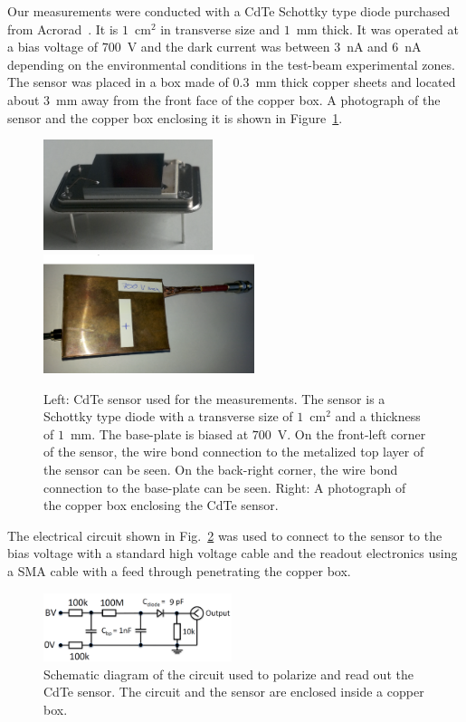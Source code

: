 %
Our measurements were conducted with a CdTe Schottky type diode purchased from 
Acrorad~\cite{acrorad}. It is $1$~$\mathrm{cm}^{2}$ in transverse size and $1$~mm thick.
It was operated at a bias voltage of $700$~V and the dark current was between $3$~nA 
and $6$~nA depending on the environmental conditions in the test-beam experimental 
zones. The sensor was placed in a box made of $0.3$~mm thick copper sheets and located
about $3$~mm away from the front face of the copper box.
A photograph of the sensor and the copper box enclosing it is shown in 
Figure~\ref{fig:CdTeSensor}.

%
\begin{figure}[htbp] 
\centering
\includegraphics[width=0.44\textwidth]{figures/CdTeSensor.png} 
\includegraphics[width=0.55\textwidth]{figures/CdTeSensorBox.png} 
\caption{Left: CdTe sensor used for the measurements. The sensor is a Schottky type diode with a transverse size 
of $1$~$\mathrm{cm}^{2}$ and a thickness of $1$~mm. The base-plate is biased at $700$~V. 
On the front-left corner of the sensor, the wire bond connection
to the metalized top layer of the sensor can be seen. On the back-right corner,
the wire bond connection to the base-plate can be seen. 
Right: A photograph of the copper box enclosing the CdTe sensor. } 
\label{fig:CdTeSensor} 
\end{figure} 
%
The electrical circuit shown in Fig.~\ref{fig:cdtecircuit} was used to connect to the sensor to the bias 
voltage with a standard high voltage cable and the readout electronics using a SMA cable with a feed 
through penetrating the copper box.

%
\begin{figure}[htbp] 
\centering
\includegraphics[width=0.49\textwidth]{figures/circuit_CdTe.png} 
\caption{Schematic diagram of the circuit used to polarize and read out the 
CdTe sensor. The circuit and the sensor are enclosed inside a copper box. }
\label{fig:cdtecircuit} 
\end{figure} 
%

